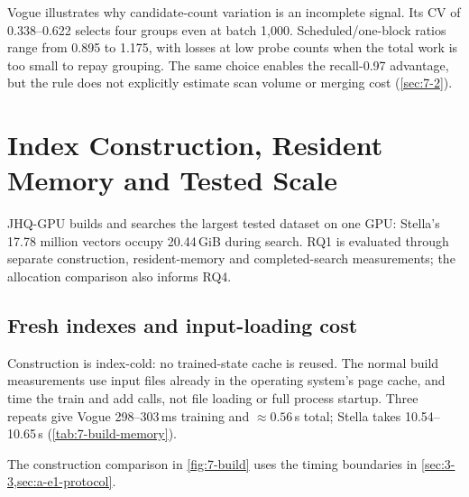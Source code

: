 Vogue illustrates why candidate-count variation is an incomplete signal.
Its CV of 0.338--0.622 selects four groups even at batch 1,000.
Scheduled/one-block ratios range from 0.895 to 1.175, with losses at
low probe counts when the total work is too small to repay grouping.
The same choice enables the recall-0.97 advantage, but the rule does not
explicitly estimate scan volume or merging cost (\cref{sec:7-2}).

\section{Index Construction, Resident Memory and Tested Scale}
\label{sec:7-7}

JHQ-GPU builds and searches the largest tested dataset on one GPU:
Stella's 17.78 million vectors occupy 20.44\,GiB during search.
RQ1 is evaluated through separate construction, resident-memory and
completed-search measurements; the allocation comparison also informs
RQ4.

\subsection{Fresh indexes and input-loading cost}

Construction is index-cold: no trained-state cache is reused. The normal
build measurements use input files already in the operating system's
page cache, and time the train and add calls, not file loading or full
process startup. Three repeats give Vogue 298--303\,ms training and
$\approx0.56$\,s total; Stella takes 10.54--10.65\,s
(\cref{tab:7-build-memory}).

\begin{table}[!htbp]
\centering
\caption[Cold construction and resident memory]{Cold JHQ construction and separately measured resident memory.
Train/add are component medians of three supplementary normal builds;
Total is the median paired sum. Memory comes
from the table-sweep implementation's two-group, 128-probe, $\alpha=100$ runs and includes context
and workspace. ``Residual'' is the modelled residual-code share of the
measured used total, not the fraction read per query.}
\label{tab:7-build-memory}
\small\setlength{\tabcolsep}{3pt}

\end{table}

The construction comparison in \cref{fig:7-build} uses the timing boundaries
in \cref{sec:3-3,sec:a-e1-protocol}.

